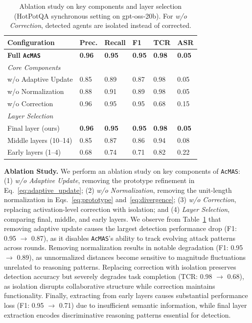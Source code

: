 \documentclass{article}
\newcommand{\app}{\texttt{AcMAS}}
\theoremstyle{plain}
\theoremstyle{definition}
\theoremstyle{remark}
\begin{document}
\begin{table}[h]
\centering
\caption{Ablation study on key components and layer selection 
(HotPotQA synchronous setting on gpt-oss-20b). For \textit{w/o Correction}, 
detected agents are isolated instead of corrected.}
\label{tab:ablation}
\small
\begin{tabularx}{\columnwidth}{l | XXXXX}
\toprule
Configuration & Prec. & Recall & F1 & TCR & ASR \\
\midrule
\textbf{Full \app{}} 
& \textbf{0.96} & \textbf{0.95} & \textbf{0.95} & \textbf{0.98} & \textbf{0.05} \\
\midrule
\multicolumn{6}{l}{\textit{Core Components}} \\
w/o Adaptive Update 
& 0.85 & 0.89 & 0.87 & 0.98 & 0.05 \\
w/o Normalization 
& 0.88 & 0.91 & 0.89 & 0.98 & 0.05 \\
w/o Correction 
& 0.96 & 0.95 & 0.95 & 0.68 & 0.15 \\
\midrule
\multicolumn{6}{l}{\textit{Layer Selection}} \\
Final layer (ours) 
& \textbf{0.96} & \textbf{0.95} & \textbf{0.95} & \textbf{0.98} & \textbf{0.05} \\
Middle layers (10--14) 
& 0.85 & 0.87 & 0.86 & 0.94 & 0.08 \\
Early layers (1--4) 
& 0.68 & 0.74 & 0.71 & 0.82 & 0.22 \\
\bottomrule
\end{tabularx}
\end{table}

\noindent\textbf{Ablation Study.}
We perform an ablation study on key components of \app{}: 
(1) \textit{w/o Adaptive Update}, removing the prototype refinement 
in Eq.~\eqref{eq:adaptive_update}; (2) \textit{w/o Normalization}, 
removing the unit-length normalization in Eqs.~\eqref{eq:prototype} 
and~\eqref{eq:divergence}; (3) \textit{w/o Correction}, replacing 
activation-level correction with isolation; and (4) \textit{Layer Selection}, 
comparing final, middle, and early layers. We observe from 
Table~\ref{tab:ablation} that removing adaptive update causes the largest 
detection performance drop (F1: 0.95 $\rightarrow$ 0.87), as it disables 
\app{}'s ability to track evolving attack patterns across rounds. Removing 
normalization results in notable degradation (F1: 0.95 $\rightarrow$ 0.89), 
as unnormalized distances become sensitive to magnitude fluctuations 
unrelated to reasoning patterns. Replacing correction with isolation 
preserves detection accuracy but severely degrades task completion 
(TCR: 0.98 $\rightarrow$ 0.68), as isolation disrupts collaborative 
structure while correction maintains functionality. Finally, extracting 
from early layers causes substantial performance loss (F1: 0.95 $\rightarrow$ 0.71) 
due to insufficient semantic information, while final layer extraction 
encodes discriminative reasoning patterns essential for detection.
\end{document}
